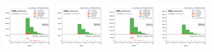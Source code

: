 \begin{figure}
    \includegraphics[width=0.24\textwidth]{chapters/Appendix/sectionQCD/figures/4j1b/mu_nJets_True_mcqcd.png}
    \includegraphics[width=0.24\textwidth]{chapters/Appendix/sectionQCD/figures/4j1b/mu_nJets_False.png}
    \includegraphics[width=0.24\textwidth]{chapters/Appendix/sectionQCD/figures/4j1b/e_nJets_True_mcqcd.png}
    \includegraphics[width=0.24\textwidth]{chapters/Appendix/sectionQCD/figures/4j1b/e_nJets_False.png}
    

\end{figure}
